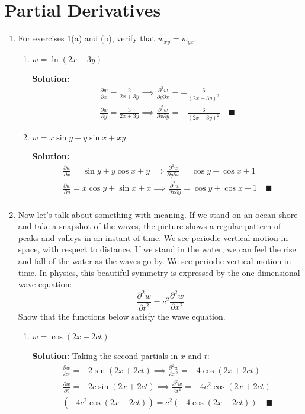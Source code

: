 \documentclass[letterpaper, 11pt]{article}
\begin{document}
\section{Partial Derivatives}
\begin{enumerate}
\item For exercises 1(a) and (b), verify that $w_{xy} = w_{yx}$.
\begin{enumerate}[label=(\alph*)]
\item $w = \ln(2x + 3y)$
\par \textbf{Solution:}
\begin{gather*}
\frac{ \partial w}{\partial x} = \frac{2}{2x + 3y} \implies \frac{ \partial^2 w}{\partial y \partial x} = -\frac{6}{(2x + 3y)^2} \\
\frac{ \partial w}{\partial y} = \frac{3}{2x + 3y} \implies \frac{ \partial^2 w}{\partial x \partial y} = -\frac{6}{(2x + 3y)^2} \quad\blacksquare
\end{gather*}

\item $w = x \sin y + y \sin x + xy$
\par \textbf{Solution:}
\begin{gather*}
\frac{\partial w}{\partial x} = \sin y + y \cos x + y \implies \frac{ \partial^2 w}{\partial y \partial x} = \cos y + \cos x + 1 \\
\frac{\partial w}{\partial y} = x\cos y + \sin x + x \implies \frac{ \partial^2 w}{\partial x \partial y} = \cos y + \cos x + 1 \quad \blacksquare \\
\end{gather*}


\end{enumerate}

\item Now let's talk about something with meaning. If we stand on an ocean shore and take a snapshot of the waves, the picture shows a regular pattern of peaks and valleys in an instant of time. We see periodic vertical motion in space, with respect to distance. If we stand in the water, we can feel the rise and fall of the water as the waves go by. We see periodic vertical motion in time. In physics, this beautiful symmetry is expressed by the one-dimensional wave equation:
\[ \frac{\partial^2 w}{\partial t^2} = c^2 \frac{ \partial^2 w}{\partial x^2} \]
Show that the functions below satisfy the wave equation. 

\begin{enumerate}[label = (\alph*)]
\item $w = \cos (2x + 2ct)$
\par \textbf{Solution:} Taking the second partials in $x$ and $t$:
\begin{gather*}
\frac{ \partial w}{\partial x} = - 2 \sin ( 2x + 2ct)\implies \frac{ \partial^2 w}{\partial x^2} = - 4 \cos (2x + 2ct) \\
\frac{\partial w}{\partial t} = -2c \sin (2x + 2ct) \implies \frac{ \partial^2 w}{\partial t^2} = - 4c^2 \cos(2x + 2ct) \\
\left( - 4c^2 \cos(2x + 2ct)\right) = c^2 \left( - 4 \cos (2x + 2ct) \right) \quad\blacksquare
\end{gather*}



\end{enumerate}
\end{enumerate}
\end{document}
